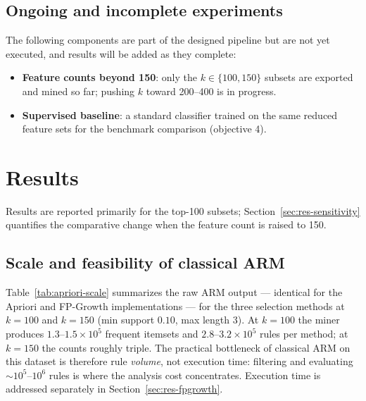 \documentclass[twocolumn]{article}
\begin{document}
\subsection{Ongoing and incomplete experiments}
\label{sec:method-ongoing}

The following components are part of the designed pipeline but are not yet
executed, and results will be added as they complete:
\begin{itemize}
    \item \textbf{Feature counts beyond 150}: only the $k \in \{100, 150\}$
    subsets are exported and mined so far; pushing $k$ toward 200--400 is in
    progress.
    \item \textbf{Supervised baseline}: a standard classifier trained on the
    same reduced feature sets for the benchmark comparison (objective 4).
\end{itemize}

\section{Results}
\label{sec:arm-results}

Results are reported primarily for the top-100 subsets; Section~\ref{sec:res-sensitivity} quantifies the comparative change when the feature count is raised to 150.

\subsection{Scale and feasibility of classical ARM}
\label{sec:res-scale}

Table~\ref{tab:apriori-scale} summarizes the raw ARM output --- identical for
the Apriori and FP-Growth implementations --- for the three selection methods
at $k=100$ and $k=150$ (min support $0.10$, max length 3). At $k=100$ the
miner produces $1.3$--$1.5\times10^{5}$ frequent itemsets and
$2.8$--$3.2\times10^{5}$ rules per method; at $k=150$ the counts roughly
triple. The practical bottleneck of classical ARM on this dataset is therefore
rule \emph{volume}, not execution time: filtering and evaluating
$\sim\!10^5$--$10^6$ rules is where the analysis cost concentrates.
Execution time is addressed separately in Section~\ref{sec:res-fpgrowth}.
\end{document}
